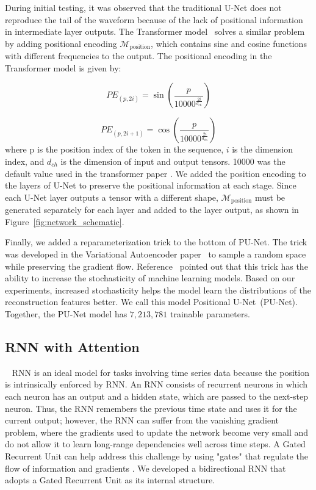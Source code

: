 During initial testing, it was observed that the traditional U-Net does not reproduce the tail of the waveform because of the lack of positional information in intermediate layer outputs. The Transformer model~\cite{Transformer} solves a similar problem by adding positional encoding $\mathcal{M}_{\mathrm{position}}$, which contains sine and cosine functions with different frequencies to the output. The positional encoding in the Transformer model is given by:

\begin{equation}
PE_{(p, 2i)} = \sin\left(\frac{p}{10000^{\frac{2i}{d_{\text{ch}}}}}\right)
\label{eqn:positional_encoding_sin}
\end{equation}

\begin{equation}
PE_{(p, 2i+1)} = \cos\left(\frac{p}{10000^{\frac{2i}{d_{\text{ch}}}}}\right)
\label{eqn:positional_encoding_cos}
\end{equation}
where p is the position index of the token in the sequence, $i$ is the dimension index, and $d_{ch}$ is the dimension of input and output tensors. 10000 was the default value used in the transformer paper \cite{Transformer}. We added the position encoding to the layers of U-Net to preserve the positional information at each stage. Since each U-Net layer outputs a tensor with a different shape, $\mathcal{M}_{\mathrm{position}}$ must be generated separately for each layer and added to the layer output, as shown in Figure~\ref{fig:network_schematic}.

Finally, we added a reparameterization trick to the bottom of PU-Net. The trick was developed in the Variational Autoencoder paper~\cite{VAE} to sample a random space while preserving the gradient flow. Reference~\cite{AAE} pointed out that this trick has the ability to increase the stochasticity of machine learning models. Based on our experiments, increased stochasticity helps the model learn the distributions of the reconstruction features better. We call this model Positional U-Net~(PU-Net). Together, the PU-Net model has $7,213,781$ trainable parameters.

\subsection{RNN with Attention}~\label{subapp:RNN}
RNN is an ideal model for tasks involving time series data because the position is intrinsically enforced by RNN. \cite{Rumelhart1986} An RNN consists of recurrent neurons in which each neuron has an output and a hidden state, which are passed to the next-step neuron. Thus, the RNN remembers the previous time state and uses it for the current output; however, the RNN can suffer from the vanishing gradient problem, where the gradients used to update the network become very small and do not allow it to learn long-range dependencies well across time steps. A Gated Recurrent Unit can help address this challenge by using "gates" that regulate the flow of information and gradients \cite{GRU}. We developed a bidirectional RNN that adopts a Gated Recurrent Unit \cite{GRU} as its internal structure.

